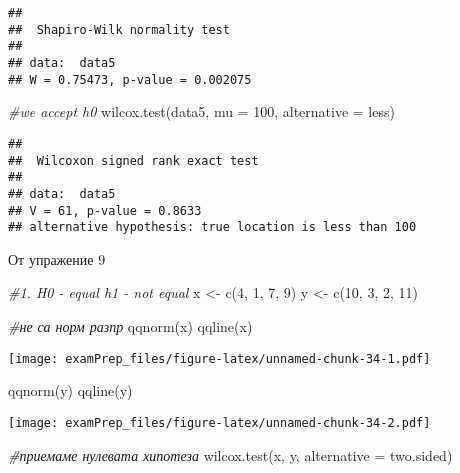 \documentclass[
]{article}
\newenvironment{Shaded}{\begin{snugshade}}{\end{snugshade}}
\newcommand{\AttributeTok}[1]{\textcolor[rgb]{0.77,0.63,0.00}{#1}}
\newcommand{\CommentTok}[1]{\textcolor[rgb]{0.56,0.35,0.01}{\textit{#1}}}
\newcommand{\DecValTok}[1]{\textcolor[rgb]{0.00,0.00,0.81}{#1}}
\newcommand{\FunctionTok}[1]{\textcolor[rgb]{0.00,0.00,0.00}{#1}}
\newcommand{\NormalTok}[1]{#1}
\newcommand{\OtherTok}[1]{\textcolor[rgb]{0.56,0.35,0.01}{#1}}
\newcommand{\StringTok}[1]{\textcolor[rgb]{0.31,0.60,0.02}{#1}}
\begin{document}
\begin{verbatim}
## 
##  Shapiro-Wilk normality test
## 
## data:  data5
## W = 0.75473, p-value = 0.002075
\end{verbatim}

\begin{Shaded}
\begin{Highlighting}[]
\CommentTok{\#we accept h0}
\FunctionTok{wilcox.test}\NormalTok{(data5, }\AttributeTok{mu =} \DecValTok{100}\NormalTok{, }\AttributeTok{alternative =} \StringTok{\textquotesingle{}less\textquotesingle{}}\NormalTok{)}
\end{Highlighting}
\end{Shaded}

\begin{verbatim}
## 
##  Wilcoxon signed rank exact test
## 
## data:  data5
## V = 61, p-value = 0.8633
## alternative hypothesis: true location is less than 100
\end{verbatim}

От упражение 9

\begin{Shaded}
\begin{Highlighting}[]
\CommentTok{\#1. H0 {-} equal h1 {-} not equal}
\NormalTok{x }\OtherTok{\textless{}{-}} \FunctionTok{c}\NormalTok{(}\DecValTok{4}\NormalTok{, }\DecValTok{1}\NormalTok{, }\DecValTok{7}\NormalTok{, }\DecValTok{9}\NormalTok{)}
\NormalTok{y }\OtherTok{\textless{}{-}} \FunctionTok{c}\NormalTok{(}\DecValTok{10}\NormalTok{, }\DecValTok{3}\NormalTok{, }\DecValTok{2}\NormalTok{, }\DecValTok{11}\NormalTok{)}

\CommentTok{\#не са норм разпр}
\FunctionTok{qqnorm}\NormalTok{(x)}
\FunctionTok{qqline}\NormalTok{(x)}
\end{Highlighting}
\end{Shaded}

\texttt{[image: examPrep\_files/figure-latex/unnamed-chunk-34-1.pdf]}

\begin{Shaded}
\begin{Highlighting}[]
\FunctionTok{qqnorm}\NormalTok{(y)}
\FunctionTok{qqline}\NormalTok{(y)}
\end{Highlighting}
\end{Shaded}

\texttt{[image: examPrep\_files/figure-latex/unnamed-chunk-34-2.pdf]}

\begin{Shaded}
\begin{Highlighting}[]
\CommentTok{\#приемаме нулевата хипотеза}
\FunctionTok{wilcox.test}\NormalTok{(x, y, }\AttributeTok{alternative =} \StringTok{\textquotesingle{}two.sided\textquotesingle{}}\NormalTok{)}
\end{Highlighting}
\end{Shaded}
\end{document}

